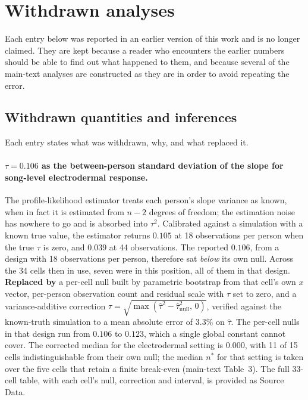 \section{Withdrawn analyses}

Each entry below was reported in an earlier version of this work and is no longer
claimed. They are kept because a reader who encounters the earlier numbers should be
able to find out what happened to them, and because several of the main-text analyses
are constructed as they are in order to avoid repeating the error.

\subsection{Withdrawn quantities and inferences}

Each entry states what was withdrawn, why, and what replaced it.

\paragraph{$\tau = 0.106$ as the between-person standard deviation of the slope for
song-level electrodermal response.}
The profile-likelihood estimator treats each person's slope variance as known, when in
fact it is estimated from $n - 2$ degrees of freedom; the estimation noise has nowhere
to go and is absorbed into $\tau^2$. Calibrated against a simulation with a known true
value, the estimator returns $0.105$ at 18 observations per person when the true $\tau$
is zero, and $0.039$ at 44 observations. The reported $0.106$, from a design with 18
observations per person, therefore sat \emph{below} its own null. Across the 34 cells
then in use, seven were in this position, all of them in that design.
\textbf{Replaced by} a per-cell null built by parametric bootstrap from that cell's own
$x$ vector, per-person observation count and residual scale with $\tau$ set to zero,
and a variance-additive correction
$\tau = \sqrt{\max(\hat\tau^2 - \hat\tau^2_{\mathrm{null}},\,0)}$, verified against the
known-truth simulation to a mean absolute error of 3.3\% on $\hat\tau$. The per-cell
nulls in that design run from $0.106$ to $0.123$, which a single global constant cannot
cover. The corrected median for the electrodermal setting is $0.000$, with 11 of 15
cells indistinguishable from their own null; the median $n^{*}$ for that setting is
taken over the five cells that retain a finite break-even (main-text Table~3). The full
33-cell table, with each cell's null, correction and interval, is provided as Source
Data.

